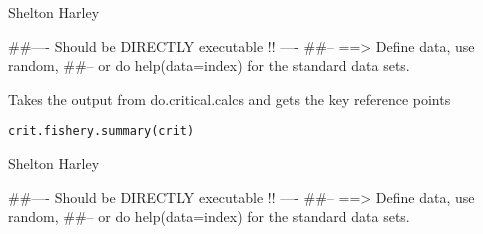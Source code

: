 \documentclass[a4paper]{book}
\begin{document}
%
\begin{Arguments}
\begin{ldescription}
\item[\code{data}] 


\item[\code{yr}] 


\item[\code{termfish}] 


\end{ldescription}
\end{Arguments}
%
\begin{Author}\relax

Shelton Harley
\end{Author}
%
\begin{Examples}
\begin{ExampleCode}
##---- Should be DIRECTLY executable !! ----
##-- ==>  Define data, use random,
##--	or do  help(data=index)  for the standard data sets.

\end{ExampleCode}
\end{Examples}
%
\begin{Description}\relax

Takes the output from do.critical.calcs and gets the key reference points
\end{Description}
%
\begin{Usage}
\begin{verbatim}
crit.fishery.summary(crit)
\end{verbatim}
\end{Usage}
%
\begin{Arguments}
\begin{ldescription}
\item[\code{crit}] 


\end{ldescription}
\end{Arguments}
%
\begin{Author}\relax
Shelton Harley

\end{Author}
%
\begin{Examples}
\begin{ExampleCode}
##---- Should be DIRECTLY executable !! ----
##-- ==>  Define data, use random,
##--	or do  help(data=index)  for the standard data sets.

\end{ExampleCode}
\end{Examples}
\end{document}
